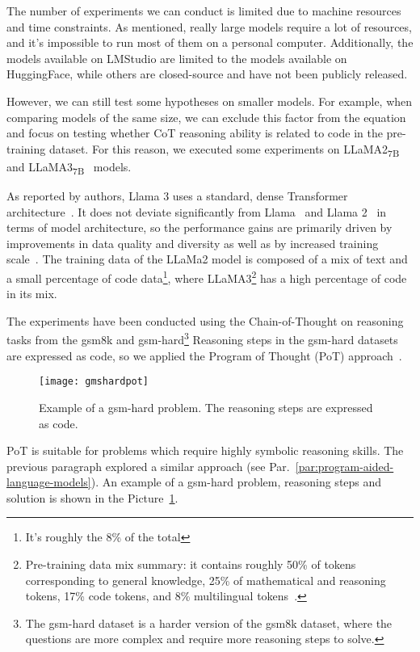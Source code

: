 The number of experiments we can conduct is limited due to machine resources and time constraints.
As mentioned, really large models require a lot of resources, and it's impossible to run most of them on a personal computer.
Additionally, the models available on LMStudio are limited to the models available on HuggingFace, while others are closed-source and have not been publicly released.

However, we can still test some hypotheses on smaller models.
For example, when comparing models of the same size, we can exclude this factor from the equation and focus on testing whether CoT reasoning ability is related to code in the pre-training dataset.
For this reason, we executed some experiments on LLaMA2\textsubscript{7B}~\cite{touvron2023llama2} and LLaMA3\textsubscript{7B}~\cite{llama3modelcard} models.

As reported by authors, Llama 3 uses a standard, dense Transformer architecture~\cite{vaswani2023attention}.
It does not deviate significantly from Llama~\cite{touvron2023llama} and Llama 2~\cite{touvron2023llama2} in terms of model architecture, so the performance gains are primarily driven by improvements in data quality and diversity as well as by increased training scale~\cite{llama3}.
The training data of the LLaMa2 model is composed of a mix of text and a small percentage of code data\footnote{It's roughly the 8\% of the total\cite{touvron2023llama2}}, where LLaMA3\footnote{Pre-training data mix summary: it contains roughly 50\% of tokens corresponding to general knowledge, 25\% of mathematical and reasoning tokens, 17\% code tokens, and 8\% multilingual tokens~\cite{llama3}.} has a high percentage of code in its mix.

The experiments have been conducted using the Chain-of-Thought on reasoning tasks from the gsm8k and gsm-hard\footnote{The gsm-hard dataset is a harder version of the gsm8k dataset, where the questions are more complex and require more reasoning steps to solve.}
Reasoning steps in the gsm-hard datasets are expressed as code, so we applied the Program of Thought (PoT) approach~\cite{chen2022program}.
\begin{figure}[h!]
	\centering
	\texttt{[image: gmshardpot]}
	\caption{Example of a gsm-hard problem. The reasoning steps are expressed as code.}
	\label{fig:pot-example}
\end{figure}
PoT is suitable for problems which require highly symbolic reasoning skills.
The previous paragraph explored a similar approach (see Par.~\ref{par:program-aided-language-models}).
An example of a gsm-hard problem, reasoning steps and solution is shown in the Picture~\ref{fig:pot-example}.


